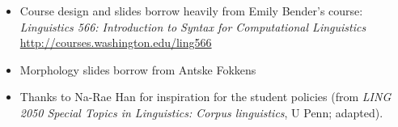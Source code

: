 \documentclass[a4paper,landscape,headrule,footrule]{foils}
\begin{document}

  

\begin{itemize}
\item Course design and slides borrow heavily from Emily Bender's course:
\textit{Linguistics 566: Introduction to Syntax for Computational Linguistics}
\\ \url{http://courses.washington.edu/ling566}
\item Morphology slides borrow from Antske Fokkens 
\item Thanks to Na-Rae Han for 
  inspiration for the student policies (from  \textit{LING 2050 Special Topics in Linguistics: Corpus linguistics}, U Penn; adapted).

\end{itemize}
\end{document}
